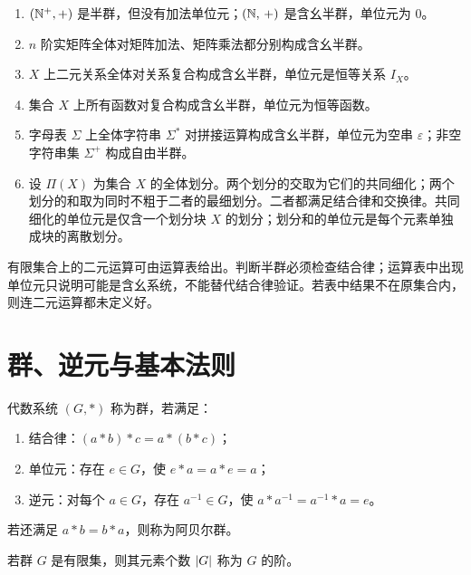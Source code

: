 \begin{example}[title={典型半群}]\label{semigroup-examples}
  \begin{enumerate}
    \item $(\mathbb{N}^+,+)$ 是半群，但没有加法单位元；$(\mathbb{N},\,+)$ 是含幺半群，单位元为 $0$。
    \item $n$ 阶实矩阵全体对矩阵加法、矩阵乘法都分别构成含幺半群。
    \item $X$ 上二元关系全体对关系复合构成含幺半群，单位元是恒等关系 $I_X$。
    \item 集合 $X$ 上所有函数对复合构成含幺半群，单位元为恒等函数。
    \item 字母表 $\Sigma$ 上全体字符串 $\Sigma^*$ 对拼接运算构成含幺半群，单位元为空串 $\varepsilon$；非空字符串集 $\Sigma^+$ 构成自由半群。
    \item 设 $\Pi(X)$ 为集合 $X$ 的全体划分。两个划分的交取为它们的共同细化；两个划分的和取为同时不粗于二者的最细划分。二者都满足结合律和交换律。共同细化的单位元是仅含一个划分块 $X$ 的划分；划分和的单位元是每个元素单独成块的离散划分。
  \end{enumerate}
\end{example}

\begin{pitfall}[运算表不能只看有没有单位元]\label{table-check-semigroup}
  有限集合上的二元运算可由运算表给出。判断半群必须检查结合律；运算表中出现单位元只说明可能是含幺系统，不能替代结合律验证。若表中结果不在原集合内，则连二元运算都未定义好。
\end{pitfall}

\section{群、逆元与基本法则}

\begin{definition}[群]\label{group}
  代数系统 $(G,*)$ 称为群，若满足：
  \begin{enumerate}
    \item 结合律：$(a*b)*c=a*(b*c)$；
    \item 单位元：存在 $e\in G$，使 $e*a=a*e=a$；
    \item 逆元：对每个 $a\in G$，存在 $a^{-1}\in G$，使 $a*a^{-1}=a^{-1}*a=e$。
  \end{enumerate}
  若还满足 $a*b=b*a$，则称为阿贝尔群。
\end{definition}

\begin{definition}[群的阶]\label{group-order}
  若群 $G$ 是有限集，则其元素个数 $\lvert G\rvert$ 称为 $G$ 的阶。
\end{definition}

